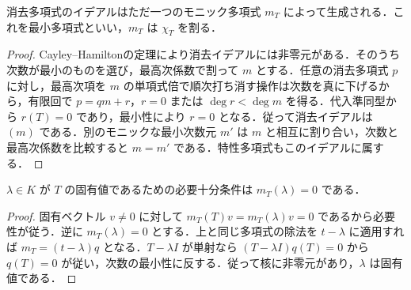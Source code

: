\begin{prop}[最小多項式]
消去多項式のイデアルはただ一つのモニック多項式 $m_T$ によって生成される．これを最小多項式といい，$m_T$ は $\chi_T$ を割る．
\end{prop}
\begin{proof}
Cayley–Hamiltonの定理により消去イデアルには非零元がある．そのうち次数が最小のものを選び，最高次係数で割って $m$ とする．任意の消去多項式 $p$ に対し，最高次項を $m$ の単項式倍で順次打ち消す操作は次数を真に下げるから，有限回で $p=qm+r$，$r=0$ または $\deg r<\deg m$ を得る．代入準同型から $r(T)=0$ であり，最小性により $r=0$ となる．従って消去イデアルは $(m)$ である．別のモニックな最小次数元 $m'$ は $m$ と相互に割り合い，次数と最高次係数を比較すると $m=m'$ である．特性多項式もこのイデアルに属する．
\end{proof}
\begin{prop}[最小多項式と固有値]
$\lambda\in K$ が $T$ の固有値であるための必要十分条件は $m_T(\lambda)=0$ である．
\end{prop}
\begin{proof}
固有ベクトル $v\ne0$ に対して $m_T(T)v=m_T(\lambda)v=0$ であるから必要性が従う．逆に $m_T(\lambda)=0$ とする．上と同じ多項式の除法を $t-\lambda$ に適用すれば $m_T=(t-\lambda)q$ となる．$T-\lambda I$ が単射なら $(T-\lambda I)q(T)=0$ から $q(T)=0$ が従い，次数の最小性に反する．従って核に非零元があり，$\lambda$ は固有値である．
\end{proof}
